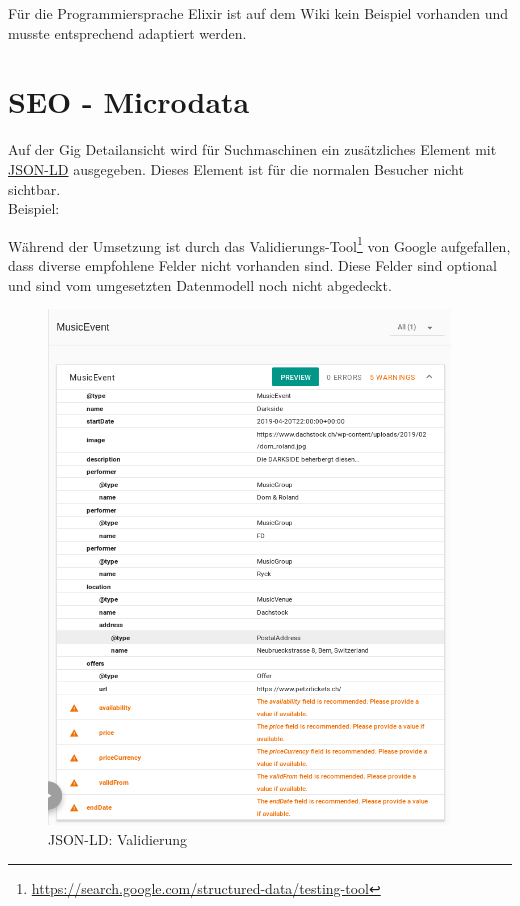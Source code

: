 Für die Programmiersprache Elixir ist auf dem Wiki kein Beispiel vorhanden und musste
entsprechend adaptiert werden.

\clearpage
\section{SEO - Microdata}

Auf der Gig Detailansicht wird für Suchmaschinen ein zusätzliches Element mit
\href{https://json-ld.org/}{JSON-LD} ausgegeben. Dieses Element ist für die
normalen Besucher nicht sichtbar.\\

\noindent{}Beispiel:



\clearpage
Während der Umsetzung ist durch das Validierungs-Tool\footnote{\url{https://search.google.com/structured-data/testing-tool}}
von Google aufgefallen, dass diverse empfohlene Felder nicht vorhanden sind.
Diese Felder sind optional und sind vom umgesetzten Datenmodell noch nicht abgedeckt.

\begin{figure}[!htb]
  \centering
  \includegraphics[width=0.95\textwidth]{realisierung/json-ld-validation.png}
  \caption{JSON-LD: Validierung}
\end{figure}

